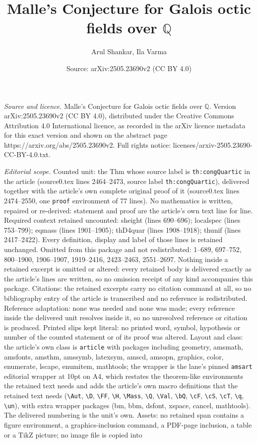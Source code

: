 \documentclass[10pt,a4paper]{amsart}
\title[Malle's Conjecture for Galois octic fields over $\mathbb Q$]{Malle's Conjecture for Galois octic fields over $\mathbb Q$}
\author{Arul Shankar, Ila Varma}
\date{Source: arXiv:2505.23690v2 (CC BY 4.0)}
\begin{document}
\maketitle

\noindent\emph{Source and licence.} Malle's Conjecture for Galois octic fields over $\mathbb Q$. Version arXiv:2505.23690v2 (CC BY 4.0), distributed under the Creative Commons Attribution 4.0 International licence, as recorded in the arXiv licence metadata for this exact version and shown on the abstract page https://arxiv.org/abs/2505.23690v2. Full rights notice: licenses/arxiv-2505.23690-CC-BY-4.0.txt.\par\smallskip

\noindent\textit{Editorial scope.} Counted unit: the Thm whose source label is \texttt{th:congQuartic} in the article (source0.tex lines 2464--2473, source label \texttt{th:congQuartic}), delivered together with the article's own complete original proof of it (source0.tex lines 2474--2550, one \texttt{proof} environment of 77 lines). No mathematics is written, repaired or re-derived: statement and proof are the article's own text line for line. Required context retained uncounted: sheight (lines 690--696); localspec (lines 753--799); eqmass (lines 1901--1905); thD4quar (lines 1908--1918); thunif (lines 2417--2422). Every definition, display and label of those lines is retained unchanged. Omitted from this package and not redistributed: 1--689, 697--752, 800--1900, 1906--1907, 1919--2416, 2423--2463, 2551--2697. Nothing inside a retained excerpt is omitted or altered: every retained body is delivered exactly as the article's lines are written, so no omission receipt of any kind accompanies this package. Citations: the retained excerpts carry no citation command at all, so no bibliography entry of the article is transcribed and no reference is redistributed. Reference adaptation: none was needed and none was made; every reference inside the delivered unit resolves inside it, so no unresolved reference or citation is produced. Printed slips kept literal: no printed word, symbol, hypothesis or number of the counted statement or of its proof was altered. Layout and class: the article's own class is \texttt{article} with packages including geometry, amsmath, amsfonts, amsthm, amssymb, latexsym, amscd, amsopn, graphics, color, enumerate, lscape, enumitem, mathtools; the wrapper is the lane's pinned \texttt{amsart} editorial wrapper at 10pt on A4, which restates the theorem-like environments the retained text needs and adds the article's own macro definitions that the retained text needs (\texttt{\textbackslash Aut}, \texttt{\textbackslash D}, \texttt{\textbackslash FF}, \texttt{\textbackslash H}, \texttt{\textbackslash Mass}, \texttt{\textbackslash Q}, \texttt{\textbackslash Val}, \texttt{\textbackslash bQ}, \texttt{\textbackslash cF}, \texttt{\textbackslash cS}, \texttt{\textbackslash cT}, \texttt{\textbackslash q}, \texttt{\textbackslash un}), with extra wrapper packages (bm, bbm, dsfont, xspace, cancel, mathtools). The delivered numbering is the unit's own. Assets: no retained span contains a figure environment, a graphics-inclusion command, a PDF-page inclusion, a table or a TikZ picture; no image file is copied into 
\end{document}
